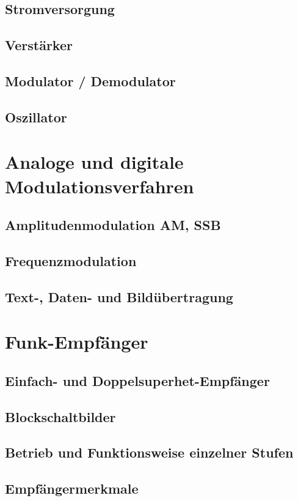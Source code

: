 \documentclass[
  ngerman,
  paper=a4,
  10pt,
  headings=small,
  DIV=15,
]{scrartcl}
\begin{document}
  \subsection{Stromversorgung}
  \subsection{Verstärker}
  \subsection{Modulator / Demodulator}
  \subsection{Oszillator}
  
  \section{Analoge und digitale Modulationsverfahren}
  \subsection{Amplitudenmodulation AM, SSB}
  \subsection{Frequenzmodulation}
  \subsection{Text-, Daten- und Bildübertragung}
  
  \section{Funk-Empfänger}
  \subsection{Einfach- und Doppelsuperhet-Empfänger}
  \subsection{Blockschaltbilder}
  \subsection{Betrieb und Funktionsweise einzelner Stufen}
  \subsection{Empfängermerkmale}
  
\end{document}
